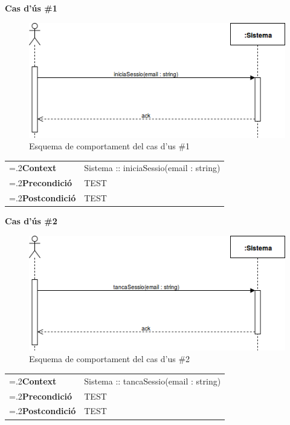 \noindent\textbf{\large Cas d'ús \#1}\\
\begin{figure}[H]
\centering
\includegraphics[scale=0.6]{Figures/casdus_01.png}
\caption{Esquema de comportament del cas d'us \#1}
\end{figure}
\begin{table}[h]
\noindent
\begin{tabularx}{\linewidth}{
>{\hsize=.2\hsize}X%
>{\hsize=0.8\hsize}X%
}
\textbf{Context} 		& Sistema :: iniciaSessio(email : string) \\
\textbf{Precondició} 	& TEST \\
\textbf{Postcondició}	& TEST \\
\end{tabularx}
\label{}
\end{table}

\noindent\textbf{\large Cas d'ús \#2}\\
\begin{figure}[H]
\centering
\includegraphics[scale=0.6]{Figures/casdus_02.png}
\caption{Esquema de comportament del cas d'us \#2}
\end{figure}
\begin{table}[h]
\noindent
\begin{tabularx}{\linewidth}{
>{\hsize=.2\hsize}X%
>{\hsize=0.8\hsize}X%
}
\textbf{Context} 		& Sistema :: tancaSessio(email : string) \\
\textbf{Precondició} 	& TEST \\
\textbf{Postcondició}	& TEST \\
\end{tabularx}
\label{}
\end{table}

